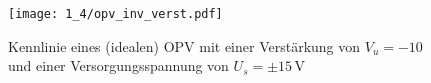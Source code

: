 \begin{figure}[H]
  \begin{center}
    \texttt{[image: 1\_4/opv\_inv\_verst.pdf]}
    \end{center}
    \caption{Kennlinie eines (idealen) OPV mit einer Verstärkung von $V_u = -10$ und einer
      Versorgungsspannung von $U_s = \pm 15 \, \si{\volt}$}
 \end{figure}
